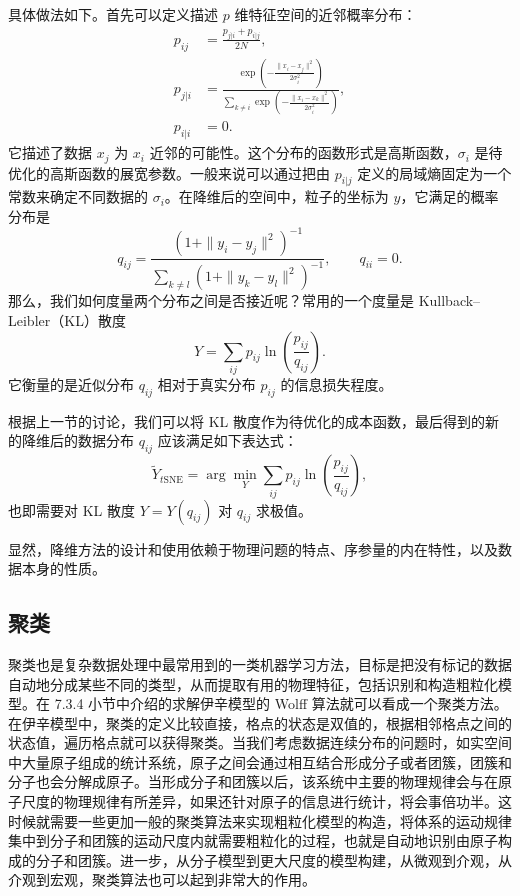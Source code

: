 具体做法如下。首先可以定义描述 $p$ 维特征空间的近邻概率分布：
\begin{equation}
\begin{aligned}
p_{ij}&=\frac{p_{j|i}+p_{i|j}}{2N},\\
p_{j|i}&=\frac{\exp\left(-\frac{\|x_i-x_j\|^2}{2\sigma_i^2}\right)}{\displaystyle\sum_{k\ne i}\exp\left(-\frac{\|x_i-x_k\|^2}{2\sigma_i^2}\right)},\\
p_{i|i}&=0.
\end{aligned}
\tag{8.2.7}
\end{equation}
它描述了数据 $x_j$ 为 $x_i$ 近邻的可能性。这个分布的函数形式是高斯函数，$\sigma_i$ 是待优化的高斯函数的展宽参数。一般来说可以通过把由 $p_{i|j}$ 定义的局域熵固定为一个常数来确定不同数据的 $\sigma_i$。在降维后的空间中，粒子的坐标为 $y$，它满足的概率分布是
\begin{equation}
q_{ij}=\frac{(1+\|y_i-y_j\|^2)^{-1}}{\displaystyle\sum_{k\ne l}(1+\|y_k-y_l\|^2)^{-1}},\qquad q_{ii}=0.
\tag{8.2.8}
\end{equation}
那么，我们如何度量两个分布之间是否接近呢？常用的一个度量是 Kullback--Leibler（KL）散度
\begin{equation}
Y=\sum_{ij}p_{ij}\ln\left(\frac{p_{ij}}{q_{ij}}\right).
\tag{8.2.9}
\end{equation}
它衡量的是近似分布 $q_{ij}$ 相对于真实分布 $p_{ij}$ 的信息损失程度。

根据上一节的讨论，我们可以将 KL 散度作为待优化的成本函数，最后得到的新的降维后的数据分布 $q_{ij}$ 应该满足如下表达式：
\begin{equation}
\widetilde Y_{t\mathrm{SNE}}=\arg\min_Y\sum_{ij}p_{ij}\ln\left(\frac{p_{ij}}{q_{ij}}\right),
\tag{8.2.10}
\end{equation}
也即需要对 KL 散度 $Y=Y(q_{ij})$ 对 $q_{ij}$ 求极值。

显然，降维方法的设计和使用依赖于物理问题的特点、序参量的内在特性，以及数据本身的性质。

\subsection{聚类}
聚类也是复杂数据处理中最常用到的一类机器学习方法，目标是把没有标记的数据自动地分成某些不同的类型，从而提取有用的物理特征，包括识别和构造粗粒化模型。在 7.3.4 小节中介绍的求解伊辛模型的 Wolff 算法就可以看成一个聚类方法。在伊辛模型中，聚类的定义比较直接，格点的状态是双值的，根据相邻格点之间的状态值，遍历格点就可以获得聚类。当我们考虑数据连续分布的问题时，如实空间中大量原子组成的统计系统，原子之间会通过相互结合形成分子或者团簇，团簇和分子也会分解成原子。当形成分子和团簇以后，该系统中主要的物理规律会与在原子尺度的物理规律有所差异，如果还针对原子的信息进行统计，将会事倍功半。这时候就需要一些更加一般的聚类算法来实现粗粒化模型的构造，将体系的运动规律集中到分子和团簇的运动尺度内就需要粗粒化的过程，也就是自动地识别由原子构成的分子和团簇。进一步，从分子模型到更大尺度的模型构建，从微观到介观，从介观到宏观，聚类算法也可以起到非常大的作用。

